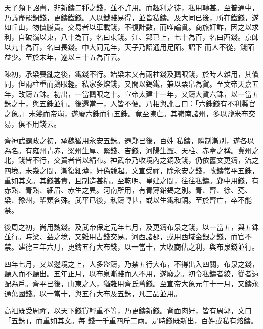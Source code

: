 \begin{pinyinscope}
 天子頻下詔書，非新鑄二種之錢，並不許用。而趣利之徒，私用轉甚。至普通中，乃議盡罷銅錢，更鑄鐵錢。人以鐵賤易得，並皆私鑄。及大同已後，所在鐵錢，遂如丘山，物價騰貴。交易者以車載錢，不復計數，而唯論貫。商旅奸詐，因之以求利，自破嶺以東，八十為百，名曰東錢。江、郢已上，七十為百，名曰西錢。京師以九十為百，名曰長錢。中大同元年，天子乃詔通用足陌。詔下
 而人不從，錢陌益少。至於末年，遂以三十五為百云。



 陳初，承梁喪亂之後，鐵錢不行。始梁末又有兩柱錢及鵝眼錢，於時人雜用，其價同，但兩柱重而鵝眼輕。私家多熔錢，又間以錫鐵，兼以粟帛為貨。至文帝天嘉五年，改鑄五銖。初出，一當鵝眼之十。宣帝太建十一年，又鑄大貨六銖，以一當五銖之十，與五銖並行。後還當一，人皆不便。乃相與訛言曰：「六銖錢有不利縣官之象。」未幾而帝崩，遂廢六銖而行五銖。竟至陳亡。其嶺南諸州，多以鹽米布交易，俱不用錢云。



 齊神武霸政之初，承魏猶用永安五銖。遷鄴已後，百姓
 私鑄，體制漸別，遂各以為名。有雍州青赤，梁州生厚、緊錢、吉錢，河陽生澀、天柱、赤牽之稱。冀州之北，錢皆不行，交貿者皆以絹布。神武帝乃收境內之銅及錢，仍依舊文更鑄，流之四境。未幾之間，漸復細薄，奸偽競起。文宣受禪，除永安之錢，改鑄常平五銖，重如其文。其錢甚貴，且制造甚精。至乾明、皇建之間，往往私鑄。鄴中用錢，有赤熟、青熟、細眉、赤生之異。河南所用，有青薄鉛錫之別。青、齊、徐、兗、梁、豫州，輩類各殊。武平已後，私鑄轉甚，或以生鐵和銅。至於齊亡，卒不能禁。



 後周之初，尚用魏錢。及武帝保定元年七月，及更鑄布泉之錢，以一當五，與五銖
 並行。時梁、益之境，又雜用古錢交易。河西諸郡，或用西域金銀之錢，而官不禁。建德三年六月，更鑄五行大布錢，以一當十，大收商估之利，與布泉錢並行。



 四年七月，又以邊境之上，人多盜鑄，乃禁五行大布，不得出入四關，布泉之錢，聽入而不聽出。五年正月，以布泉漸賤而人不用，遂廢之。初令私鑄者絞，從者遠配為戶。齊平已後，山東之人，猶雜用齊氏舊錢。至宣帝大象元年十一月，又鑄永通萬國錢。以一當十，與五行大布及五銖，凡三品並用。



 高祖既受周禪，以天下錢貨輕重不等，乃更鑄新錢。背面肉好，皆有周郭，文曰「五銖」，而重如其文。每
 錢一千重四斤二兩。是時錢既新出，百姓或私有熔鑄。




\end{pinyinscope}
